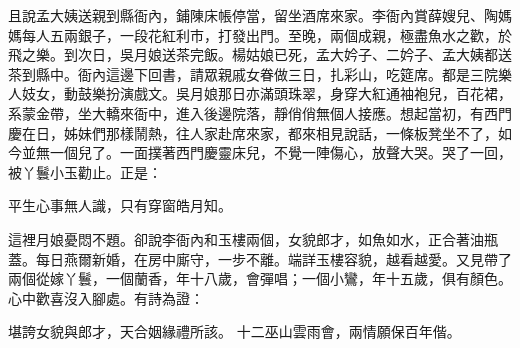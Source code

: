 \begin{showcontents}{}
且說孟大姨送親到縣衙內，鋪陳床帳停當，留坐酒席來家。李衙內賞薛嫂兒、陶媽媽每人五兩銀子，一段花紅利市，打發出門。至晚，兩個成親，極盡魚水之歡，於飛之樂。到次日，吳月娘送茶完飯。楊姑娘已死，孟大妗子、二妗子、孟大姨都送茶到縣中。衙內這邊下回書，請眾親戚女眷做三日，扎彩山，吃筵席。都是三院樂人妓女，動鼓樂扮演戲文。吳月娘那日亦滿頭珠翠，身穿大紅通袖袍兒，百花裙，系蒙金帶，坐大轎來衙中，進入後邊院落，靜俏俏無個人接應。想起當初，有西門慶在日，姊妹們那樣鬧熱，往人家赴席來家，都來相見說話，一條板凳坐不了，如今並無一個兒了。一面撲著西門慶靈床兒，不覺一陣傷心，放聲大哭。哭了一回，被丫鬟小玉勸止。正是：

平生心事無人識，只有穿窗皓月知。

這裡月娘憂悶不題。卻說李衙內和玉樓兩個，女貌郎才，如魚如水，正合著油瓶蓋。每日燕爾新婚，在房中廝守，一步不離。端詳玉樓容貌，越看越愛。又見帶了兩個從嫁丫鬟，一個蘭香，年十八歲，會彈唱；一個小鸞，年十五歲，俱有顏色。心中歡喜沒入腳處。有詩為證：

堪誇女貌與郎才，天合姻緣禮所該。
十二巫山雲雨會，兩情願保百年偕。


\end{showcontents}

